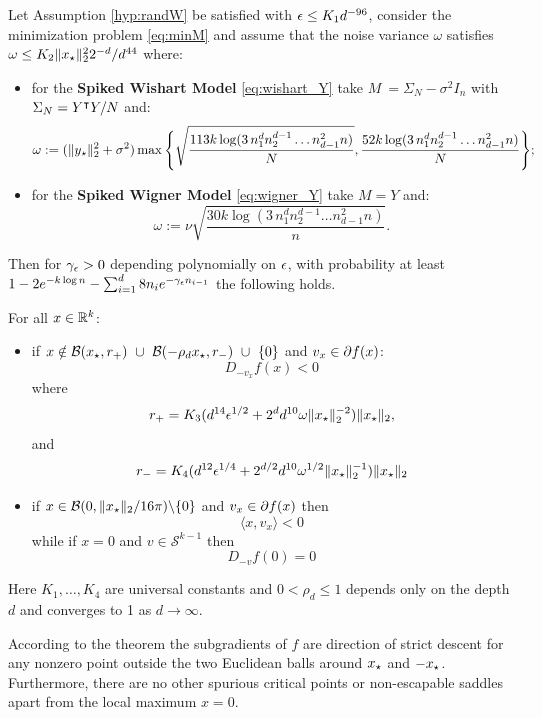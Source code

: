 \begin{thm}\label{thm:main_rand}
	Let Assumption \ref{hyp:randW} be satisfied with $\epsilon \leq K_1 d^{-96}$, consider the minimization problem \eqref{eq:minM} and assume that the noise variance ${\omega}$ satisfies ${\omega} \leq K_2 \|{x_{\star}}\|_2^2 2^{-d}/d^{44}$ where:
	\begin{itemize}
		\item for the \textbf{Spiked Wishart Model} \eqref{eq:wishart_Y}  take $M~=\Sigma_N-\sigma^2 I_n$ with $\Sigma_N = Y^\intercal Y/N$ and:
		\[
		{\omega} :={(\|{{y_\star}}\|_2^2 + \sigma^2)}  \max \Bigg\{\sqrt{\frac{113 k \log (3\, n_1^d n_2^{d-1} \dots n_{d-1}^2 n) }{N}}, \frac{52 k \log (3\, n_1^d n_2^{d-1} \dots n_{d-1}^2 n) }{N} \Bigg\};
		\]
		
		\item for the \textbf{Spiked Wigner Model} \eqref{eq:wigner_Y}  take $M = Y$ and:
		\[
		{\omega} := {\nu} \sqrt{  \frac{30 k \log (3\, n_1^d n_2^{d-1} \dots n_{d-1}^2 n)  }{n}}.
		\]
	\end{itemize}
	
	Then for $\gamma_\epsilon > 0$ depending polynomially on $\epsilon$,
	with probability at least  $1 - 2e^{- k \log n} - \sum_{i=1}^d 8 n_i e^{- \gamma_\epsilon n_{i-1}}$
	the following holds.
	
	For all $x \in \mathbb{R}^k$:
	\begin{itemize}
		\item if $x \notin \mathcal{B}({x_{\star}}, r_+)~\cup~\mathcal{B}(-\rho_d {x_{\star}}, r_-)~\cup~\{0\}$ and $v_x \in \partial f(x)$:
		\[
		D_{-v_x} f(x) < 0
		\]
		where 
		\[
		r_+ = K_3 (d^{14} {\epsilon^{1/2}} + 2^d d^{10} \omega  \|{x_{\star}}\|_2^{-2})  \|{x_{\star}}\|_2,
		\]
		and
		\[
		r_- =  K_4 (d^{12} {\epsilon}^{1/4} + 2^{d/2} d^{10} \omega^{1/2} \|{x_{\star}}\|_2^{-1})   \|{x_{\star}}\|_2
		\]
		\item if $x \in \mathcal{B}(0,  \|{x_{\star}}\|_2/16 \pi) \backslash \{0\}$  and $v_x \in \partial f(x)$ then \[\langle x, v_x\rangle < 0\]
		while if $x = 0$ and $v \in \mathcal{S}^{k-1}$ then 
		\[
		D_{-v} f(0) = 0
		\]
	\end{itemize} 
	Here $K_1, \dots, K_4$  are universal constants and $0< \rho_d \leq 1$ depends only on the depth $d$ and converges to 1 as $d \to \infty$.
\end{thm}



According to the theorem the subgradients of $f$ are direction of strict descent for any nonzero point outside the two Euclidean balls around ${x_{\star}}$ and $-{x_{\star}}$. Furthermore, there are no other spurious critical points or non-escapable saddles apart from the local maximum $x = 0$.

